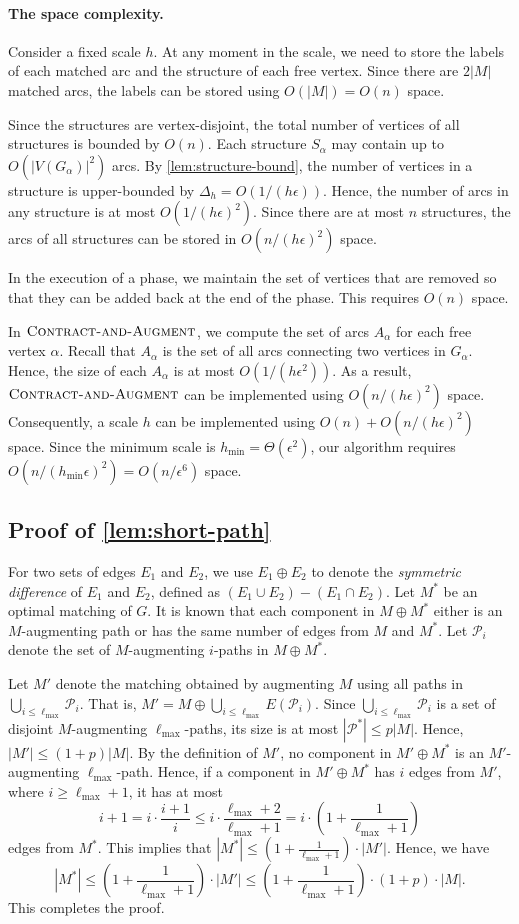 \documentclass{article}
\newcommand{\alp}{\alpha}
\newcommand{\eps}{\epsilon}
\newcommand{\lmax}{\ell_{\max}}
\newcommand{\hmin}{h_{\min}}
\newcommand{\calP}{\mathcal{P}}
\newcommand{\algCheck}{\textsc{Contract-and-Augment}\xspace}
\newcommand{\rb}[1]{\left( #1 \right)}
\begin{document}
\paragraph{The space complexity.}
Consider a fixed scale $h$.
At any moment in the scale, we need to store the labels of each matched arc and the structure of each free vertex.
Since there are $2|M|$ matched arcs, the labels can be stored using $O(|M|) = O(n)$ space.

Since the structures are vertex-disjoint, the total number of vertices of all structures is bounded by $O(n)$.
Each structure $S_\alp$ may contain up to $O(|V(G_\alp)|^2)$ arcs.
By \cref{lem:structure-bound}, the number of vertices in a structure is upper-bounded by $\Delta_h = O(1 / (h\eps))$.
Hence, the number of arcs in any structure is at most $O(1 / (h\eps)^2)$.
Since there are at most $n$ structures, the arcs of all structures can be stored in $O(n / (h\eps)^2)$ space.

In the execution of a phase, we maintain the set of vertices that are removed so that they can be added back at the end of the phase.
This requires $O(n)$ space.

In $\algCheck$, we compute the set of arcs $A_\alp$ for each free vertex $\alp$.
Recall that $A_\alp$ is the set of all arcs connecting two vertices in $G_\alp$.
Hence, the size of each $A_\alp$ is at most $O(1 / (h\eps^2))$.
As a result, $\algCheck$ can be implemented using $O(n / (h\eps)^2)$ space.
Consequently, a scale $h$ can be implemented using $O(n) + O(n / (h\eps)^2)$ space.
Since the minimum scale is $\hmin = \Theta(\eps^2)$, our algorithm requires $O(n / (\hmin \eps)^2) = O(n / \eps^6)$ space.

\subsection{Proof of \cref{lem:short-path}}
\label{sec:proof-short-path}
For two sets of edges $E_1$ and $E_2$, we use $E_1 \oplus E_2$ to denote the \emph{symmetric difference} of $E_1$ and $E_2$, defined as $(E_1 \cup E_2) - (E_1 \cap E_2)$.
Let $M^*$ be an optimal matching of $G$.
It is known that each component in $M \oplus M^*$ either is an $M$-augmenting path or has the same number of edges from $M$ and $M^*$.
Let $\calP_i$ denote the set of $M$-augmenting $i$-paths in $M \oplus M^*$.


Let $M'$ denote the matching obtained by augmenting $M$ using all paths in $\bigcup_{i \leq \lmax} \calP_i$.
That is, $M' = M \oplus \bigcup_{i \leq \lmax} E(\calP_i)$.
Since $\bigcup_{i \leq \lmax} \calP_i$ is a set of disjoint $M$-augmenting $\lmax$-paths, its size is at most $|\calP^*| \leq p|M|$.
Hence, $|M'| \leq (1 + p)|M|$.
By the definition of $M'$, no component in $M' \oplus M^*$ is an $M'$-augmenting $\lmax$-path.
Hence, if a component in $M' \oplus M^*$ has $i$ edges from $M'$, where $i \geq \lmax + 1$, it has at most
\[
    i+1 = i \cdot \frac{i+1}{i} \leq i \cdot \frac{\lmax+2}{\lmax+1} = i \cdot \rb{1 + \frac{1}{\lmax+1}}
\]
edges from $M^*$. This implies that $|M^*| \leq \rb{1 + \frac{1}{\lmax+1}} \cdot |M'|$.
Hence, we have
\[
    |M^*| \leq \rb{1 + \frac{1}{\lmax+1}} \cdot |M'| \leq \rb{1 + \frac{1}{\lmax+1}} \cdot (1+p) \cdot |M|.
\]
This completes the proof.
\end{document}
